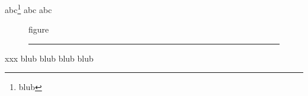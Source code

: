 \documentclass[12pt,a4paper]{article}
\begin{document}
abc\footnote{blub\tagmcend}
\newpage
abc
\tagmcend
{}
abc
\tagmcend 
\begin{figure}[b]
figure \rule{1cm}{0.2\textwidth}
\tagmcend
\end{figure}
xxx
\newpage
blub
\newpage
blub
\tagmcend
\newpage
{}blub
\tagmcend
{}blub
\tagmcend
\end{document}
